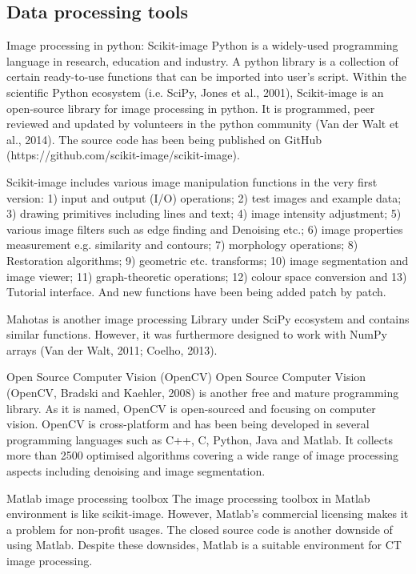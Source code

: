 \subsection{Data processing tools}
Image processing in python: Scikit-image 
Python is a widely-used programming language in research, education and industry. A python library is a collection of certain ready-to-use functions that can be imported into user’s script. Within the scientific Python ecosystem (i.e. SciPy, Jones et al., 2001), Scikit-image is an open-source library for image processing in python. It is programmed, peer reviewed and updated by volunteers in the python community (Van der Walt et al., 2014). The source code has been being published on GitHub (https://github.com/scikit-image/scikit-image). 

Scikit-image includes various image manipulation functions in the very first version: 1) input and output (I/O) operations; 2) test images and example data; 3) drawing primitives including lines and text; 4) image intensity adjustment; 5) various image filters such as edge finding and Denoising etc.; 6) image properties measurement e.g. similarity and contours; 7) morphology operations; 8) Restoration algorithms; 9) geometric etc. transforms; 10) image segmentation and image viewer; 11) graph-theoretic operations; 12) colour space conversion and 13) Tutorial interface. And new functions have been being added patch by patch. 

Mahotas is another image processing Library under SciPy ecosystem and contains similar functions. However, it was furthermore designed to work with NumPy arrays (Van der Walt, 2011; Coelho, 2013). 

Open Source Computer Vision (OpenCV) 
Open Source Computer Vision (OpenCV, Bradski and Kaehler, 2008) is another free and mature programming library. As it is named, OpenCV is open-sourced and focusing on computer vision. OpenCV is cross-platform and has been being developed in several programming languages such as C++, C, Python, Java and Matlab. It collects more than 2500 optimised algorithms covering a wide range of image processing aspects including denoising and image segmentation. 

Matlab image processing toolbox 
The image processing toolbox in Matlab environment is like scikit-image. However, Matlab’s commercial licensing makes it a problem for non-profit usages. The closed source code is another downside of using Matlab. Despite these downsides, Matlab is a suitable environment for CT image processing. 


